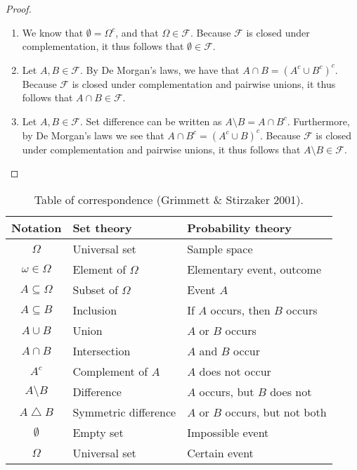 \begin{proof}
\begin{enumerate}
\item
We know that $\emptyset = \Omega^c$, and that $\Omega\in\mathcal{F}$. Because $\mathcal{F}$ is closed under complementation, it thus follows that $\emptyset\in\mathcal{F}$.
\item
Let $A,B\in\mathcal{F}$. By De Morgan's laws, we have that $A\cap B = (A^c\cup B^c)^c$. Because $\mathcal{F}$ is closed under complementation and pairwise unions, it thus follows that $A\cap B\in\mathcal{F}$.
\item
Let $A,B\in\mathcal{F}$. Set difference can be written as $A\setminus B = A\cap B^c$. Furthermore, by De Morgan's laws we see that $A\cap B^c = (A^c\cup B)^c$. Because $\mathcal{F}$ is closed under complementation and pairwise unions, it thus follows that $A\setminus B\in\mathcal{F}$.
\end{enumerate}
\end{proof}

\begin{table}
\centering
\caption{Table of correspondence (Grimmett \& Stirzaker 2001).}
\begin{tabular}{|c|l|l|} \hline
Notation 			& Set theory			& Probability theory \\ \hline
$\Omega$			& Universal set			& Sample space \\ 
$\omega\in\Omega$	& Element of $\Omega$	& Elementary event, outcome \\
$A\subseteq\Omega$	& Subset of $\Omega$	& Event $A$ \\
$A\subseteq B$		& Inclusion				& If $A$ occurs, then $B$ occurs \\
$A\cup B$			& Union					& $A$ or $B$ occurs \\ 
$A\cap B$			& Intersection			& $A$ and $B$ occur\\ 
$A^c$				& Complement of $A$		& $A$ does not occur \\
$A\setminus B$		& Difference			& $A$ occurs, but $B$ does not \\
$A\bigtriangleup B$	& Symmetric difference	& $A$ or $B$ occurs, but not both \\
$\emptyset$			& Empty set 			& Impossible event \\
$\Omega$			& Universal set			& Certain event \\ \hline
\end{tabular}
\end{table}


